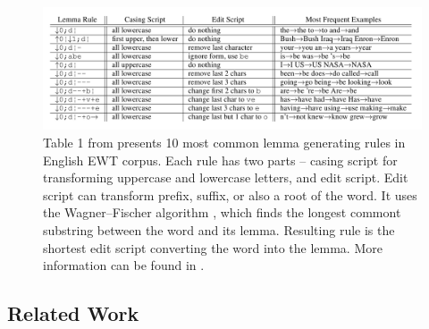 \begin{figure}[!ht]
\centering
\includegraphics[width=1\textwidth]{../img/lemma_rules}
\protect\caption{
Table 1 from \citep{Straka2019b} presents 10 most common lemma generating rules in English EWT corpus. Each rule has two parts -- casing script for transforming uppercase and lowercase letters, and edit script. Edit script can transform prefix, suffix, or also a root of the word. It uses the Wagner–Fischer algorithm \citep{Wagner}, which finds the longest commont substring between the word and its lemma. Resulting rule is the shortest edit script converting the word into the lemma. More information can be found in \citep{Straka2019b}.
}
\label{fig:lemma_rules}
\end{figure}


\subsection{Related Work}
